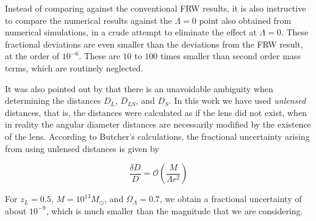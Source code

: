 Instead of comparing against the conventional FRW results, it is also instructive to compare the numerical results against the $\Lambda = 0$ point also obtained from numerical simulations, in a crude attempt to eliminate the effect at $\Lambda = 0$. These fractional deviations are even smaller than the deviations from the FRW result, at the order of $10^{-6}$. These are $10$ to $100$ times smaller than second order mass terms, which are routinely neglected. 

It was also pointed out by \citet{butcher2016no} that there is an unavoidable ambiguity when determining the distances $D_L$, $D_{LS}$, and $D_S$. In this work we have used \emph{unlensed} distances, that is, the distances were calculated as if the lens did not exist, when in reality the angular diameter distances are necessarily modified by the existence of the lens. According to Butcher's calculations, the fractional uncertainty arising from using unlensed distances is given by

\begin{equation}
  \frac{\delta D}{D} = \mathcal{O}\left (\frac{M}{\Lambda r^2} \right )
\end{equation}

For $z_L = 0.5$, $M = 10^{13} M_{\odot}$, and $\Omega_{\Lambda} = 0.7$, we obtain a fractional uncertainty of about $10^{-9}$, which is much smaller than the magnitude that we are considering. 
